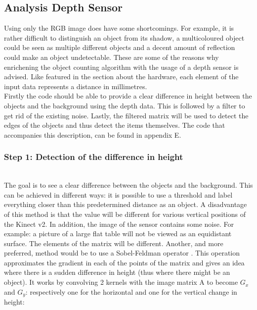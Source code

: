 \documentclass{article}
\begin{document}
\subsection{Analysis Depth Sensor}
Using only the RGB image does have some shortcomings. For example, it is rather difficult to distinguish an object from its shadow, a multicoloured object could be seen as multiple different objects and a decent amount of reflection could make an object undetectable. These are some of the reasons why enrichening the object counting algorithm with the usage of a depth sensor is advised. Like featured in the section about the hardware, each element of the input data represents a distance in millimetres.\\
Firstly the code should be able to provide a clear difference in height between the objects and the background using the depth data. This is followed by a filter to get rid of the existing noise. Lastly, the filtered matrix will be used to detect the edges of the objects and thus detect the items themselves. The code that accompanies this description, can be found in appendix E.
 
\subsubsection{Step 1: Detection of the difference in height}\mbox{}\\
The goal is to see a clear difference between the objects and the background. This can be achieved in different ways: it is possible to use a threshold and label everything closer than this predetermined distance as an object. A disadvantage of this method is that the value will be different for various vertical positions of the Kinect v2. In addition, the image of the sensor contains some noise. For example: a picture of a large flat table will not be viewed as an equidistant surface. The elements of the matrix will be different. Another, and more preferred, method would be to use a Sobel-Feldman operator \cite{Sobel_operator}. This operation approximates the gradient in each of the points of the matrix and gives an idea where there is a sudden difference in height (thus where there might be an object). It works by convolving 2 kernels with the image matrix A to become $G_{x}$ and $G_{y}$: respectively one for the horizontal and one for the vertical change in height: 
\end{document}
